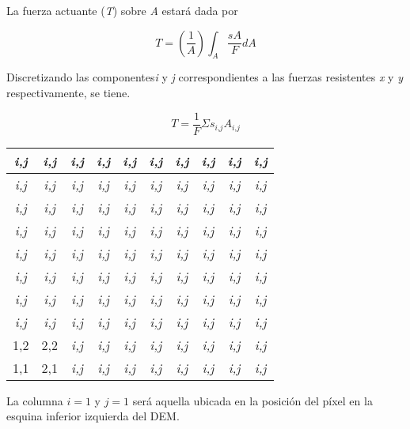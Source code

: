 La fuerza actuante (\textit{T}) sobre \textit{A} estar\'a dada por

$$\textit{T}=\left(\frac{1}{\textit{A}}\right)\int_{\textit{A}}^{} \frac{\textit{s}\textit{A}}{\textit{F}} \textit{dA}$$

Discretizando las componentes\textit{i} y \textit{j} correspondientes a las fuerzas resistentes \textit{x} y \textit{y} respectivamente, se tiene.

$$\textit{T} = \frac{1}{\textit{F}} \Sigma\textit{s}_{\textit{i,j}} \textit{A}_{\textit{i,j}}$$

\begin{center}


\begin{tabular}{|c|c|c|c|c|c|c|c|c|c|}
\hline 
\textit{i,j} & \textit{i,j} & \textit{i,j} & \textit{i,j} & \textit{i,j} & \textit{i,j} & \textit{i,j} & \textit{i,j} & \textit{i,j} & \textit{i,j} \\ 
\hline 
\textit{i,j}& \textit{i,j}& \textit{i,j} & \textit{i,j} &\textit{i,j} & \textit{i,j} & \textit{i,j} & \textit{i,j} & \textit{i,j} & \textit{i,j} \\ 
\hline 
\textit{i,j} & \textit{i,j} & \textit{i,j} & \textit{i,j} & \textit{i,j} & \textit{i,j} & \textit{i,j} & \textit{i,j} & \textit{i,j} & \textit{i,j} \\ 
\hline 
\textit{i,j} & \textit{i,j} & \textit{i,j} & \textit{i,j} & \textit{i,j} & \textit{i,j} & \textit{i,j} & \textit{i,j} & \textit{i,j} & \textit{i,j} \\ 
\hline 
\textit{i,j} & \textit{i,j} & \textit{i,j} & \textit{i,j} & \textit{i,j} & \textit{i,j} & \textit{i,j} & \textit{i,j} & \textit{i,j} & \textit{i,j} \\ 
\hline 
\textit{i,j}& \textit{i,j}& \textit{i,j}& \textit{i,j} & \textit{i,j}& \textit{i,j}& \textit{i,j} & \textit{i,j} &\textit{i,j} & \textit{i,j} \\ 
\hline 
\textit{i,j} &\textit{i,j} & \textit{i,j} & \textit{i,j} & \textit{i,j} & \textit{i,j}& \textit{i,j}& \textit{i,j} & \textit{i,j}& \textit{i,j} \\ 
\hline 
\textit{i,j} & \textit{i,j}& \textit{i,j}& \textit{i,j} & \textit{i,j} & \textit{i,j} & \textit{i,j} & \textit{i,j}& \textit{i,j} & \textit{i,j}\\ 
\hline 
1,2 & 2,2 & \textit{i,j} & \textit{i,j} & \textit{i,j} & \textit{i,j}& \textit{i,j} & \textit{i,j} & \textit{i,j}& \textit{i,j}\\ 
\hline 
1,1 & 2,1 & \textit{i,j}& \textit{i,j} & \textit{i,j} & \textit{i,j} & \textit{i,j} & \textit{i,j}& \textit{i,j} & \textit{i,j}\\ 
\hline 
\end{tabular} 
\end{center}
La columna $\textit{i}=1$ y $\textit{j}=1$ ser\'a aquella ubicada en la posici\'on del p\'ixel en la esquina inferior izquierda del DEM.

